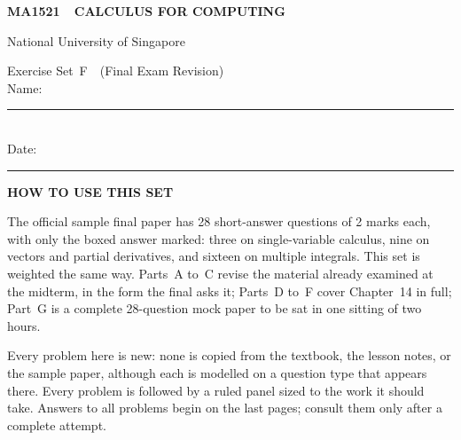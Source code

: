 \documentclass[11pt,oneside]{article}
\newcommand{\panel}[2]{%
  \par\addvspace{10pt}\needspace{5\baselineskip}%
  \noindent{\color{ThomasBlue}\rule{\linewidth}{1.1pt}}\par\vspace{-2pt}
  \noindent\colorbox{ThomasTint}{%
  \begin{minipage}{\dimexpr\linewidth-2\fboxsep\relax}
  \vspace{4pt}
  {\sffamily\bfseries\fontsize{9}{11}\selectfont\color{ThomasDeep}#1}\par\vspace{4pt}
  #2\par\vspace{4pt}
  \end{minipage}}\par\vspace{-1pt}
  \noindent{\color{RuleGray}\rule{\linewidth}{0.5pt}}\par\addvspace{11pt}
}
\newcounter{prob}
\begin{document}
\thispagestyle{plain}

\noindent{\color{ThomasBlue}\rule{\linewidth}{3.2pt}}\par\vspace{2.5pt}
\noindent{\color{RuleGray}\rule{\linewidth}{0.5pt}}\par\vspace{16pt}

\noindent
\begin{minipage}[t]{0.62\linewidth}
{\sffamily\bfseries\fontsize{12}{14}\selectfont\color{ThomasDeep}MA1521\ \ CALCULUS FOR COMPUTING}\par\vspace{2pt}
{\sffamily\fontsize{9.5}{11}\selectfont\color{SoftGray}National University of Singapore}
\end{minipage}%
\begin{minipage}[t]{0.38\linewidth}
\raggedleft
{\sffamily\fontsize{9.5}{12}\selectfont\color{SoftGray}
Exercise Set~F\ \ (Final Exam Revision)\\
Name:\ \rule{3.2cm}{0.4pt}\\[2pt]
Date:\ \rule{3.2cm}{0.4pt}}
\end{minipage}

\vspace{20pt}

\vspace{10pt}
\par\vspace{3pt}

\vspace{12pt}
\noindent{\color{ThomasBlue}\rule{\linewidth}{1.4pt}}
\vspace{16pt}

\panel{HOW TO USE THIS SET}{%
\fontsize{10}{12.5}\selectfont
The official sample final paper has 28 short-answer questions of 2 marks each, with only the
boxed answer marked: three on single-variable calculus,
nine on vectors and partial derivatives, and sixteen on multiple integrals. This set is
weighted the same way. Parts~A to~C revise the material already examined at the midterm,
in the form the final asks it; Parts~D to~F cover Chapter~14 in full; Part~G is a complete
28-question mock paper to be sat in one sitting of two hours.
\par\vspace{5pt}
Every problem here is new: none is copied from the textbook, the lesson notes, or the sample
paper, although each is modelled on a question type that appears there. Every problem is
followed by a ruled panel sized to the work it should take. Answers to all problems begin on
the last pages; consult them only after a complete attempt.
}
\end{document}
